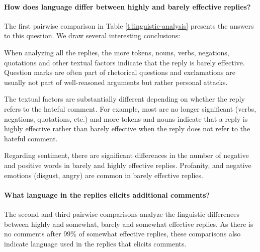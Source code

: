 \documentclass[11pt]{article}
\begin{document}


\paragraph{How does language differ between highly and barely effective replies?}
The first pairwise comparison in Table \ref{t:linguistic-analysis} presents the answers to this question.
We draw several interesting conclusions:
\begin{compactitem}
	\item When analyzing all the replies, the more tokens, nouns, verbs, negations, quotations and other textual factors indicate that the reply is barely effective.
	Question marks are often part of rhetorical questions and exclamations are usually not part of well-reasoned arguments but rather personal attacks.
	\item The textual factors are substantially different depending on whether the reply refers to the hateful comment.
	For example, most are no longer significant (verbs, negations, quotations, etc.) and more tokens and nouns indicate that a reply is highly effective rather than barely effective when the reply does not refer to the hateful comment.
	\item Regarding sentiment, there are significant differences in the number of negative and positive words in barely and highly effective replies. 
	Profanity, and negative emotions (disgust, angry) are common in barely effective replies.
\end{compactitem}


\paragraph{What language in the replies elicits additional comments?}
The second and third pairwise comparisons analyze the linguistic differences between highly and somewhat, barely and somewhat effective replies. 
As there is no comments after 99\% of somewhat effective replies, these comparisons also indicate language used in the replies that elicits comments.
\end{document}
